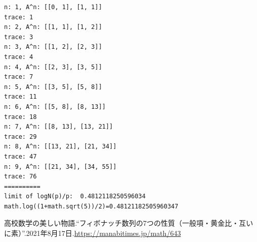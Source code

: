 \documentclass[a4paper, 10pt, dvipdfmx]{jlreq}
\begin{document}


\begin{lstlisting}[caption=result, label=code:result]
n: 1, A^n: [[0, 1], [1, 1]]
trace: 1
n: 2, A^n: [[1, 1], [1, 2]]
trace: 3
n: 3, A^n: [[1, 2], [2, 3]]
trace: 4
n: 4, A^n: [[2, 3], [3, 5]]
trace: 7
n: 5, A^n: [[3, 5], [5, 8]]
trace: 11
n: 6, A^n: [[5, 8], [8, 13]]
trace: 18
n: 7, A^n: [[8, 13], [13, 21]]
trace: 29
n: 8, A^n: [[13, 21], [21, 34]]
trace: 47
n: 9, A^n: [[21, 34], [34, 55]]
trace: 76
==========
limit of logN(p)/p:  0.4812118250596034
math.log((1+math.sqrt(5))/2)=0.48121182505960347
\end{lstlisting}

\begin{thebibliography}{9}
  高校数学の美しい物語.``フィボナッチ数列の7つの性質（一般項・黄金比・互いに素）''.2021年8月17日.\url{https://manabitimes.jp/math/643}
\end{thebibliography}
\end{document}
